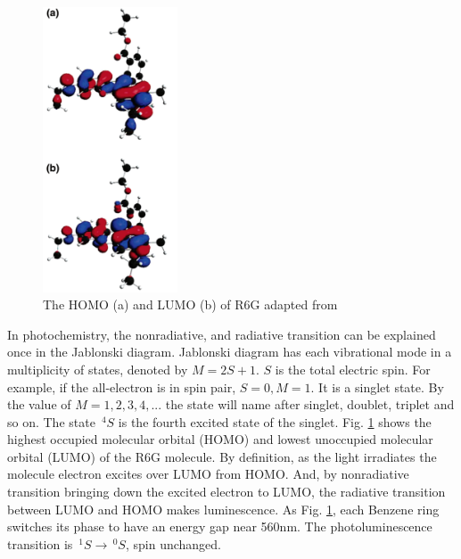 \documentclass{article}
\begin{document}
 \begin{figure}[ht]
  \centering
  \includegraphics[width=4cm]{../results/Rhodamine_homo_lumo.png}
  \caption{The HOMO (a) and LUMO (b) of R6G adapted from \cite{rhodamine_HOMO_LUMO}}
  \label{fig:rhodamine_homo_lumo}
 \end{figure}

 In photochemistry, the nonradiative, and radiative transition can be explained once in the Jablonski diagram.
 Jablonski diagram has each vibrational mode in a multiplicity of states, denoted by $M = 2S+1$. $S$ is the total electric spin.
 For example, if the all-electron is in spin pair, $S=0, M=1$.
 It is a singlet state.
 By the value of $M=1,2,3,4, ... $ the state will name after singlet, doublet, triplet and so on.
 The state $\,^4S$ is the fourth excited state of the singlet.
 Fig. \ref{fig:rhodamine_homo_lumo} shows the highest occupied molecular orbital (HOMO) and lowest unoccupied molecular orbital (LUMO) of the R6G molecule.
 By definition, as the light irradiates the molecule electron excites over LUMO from HOMO.
 And, by nonradiative transition bringing down the excited electron to LUMO, the radiative transition between LUMO and HOMO makes luminescence.
 As Fig. \ref{fig:rhodamine_homo_lumo}, each Benzene ring switches its phase to have an energy gap near 560nm.
 The photoluminescence transition is $\,^1S \rightarrow \,^0S$, spin unchanged.
\end{document}
